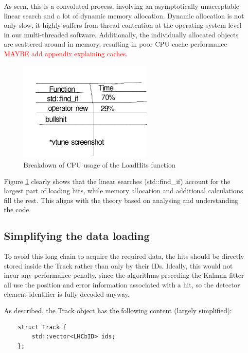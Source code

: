 \documentclass[12pt]{article}
\begin{document}
As seen, this is a convoluted process, involving an asymptotically unacceptable linear search and a lot of dynamic memory allocation. Dynamic allocation is not only slow, it highly suffers from thread contention at the operating system level in our multi-threaded software. Additionally, the individually allocated objects are scattered around in memory, resulting in poor CPU cache performance \textcolor{red}{MAYBE add appendix explaining caches}.

\begin{figure}[H]
	\begin{center}
		\includegraphics[width=0.6\textwidth]{kalmanfit_loadhits_breakdown}
	\end{center}
	\caption{Breakdown of CPU usage of the LoadHits function}
	\label{fig_kalmanfit_loadhits_breakdown}
\end{figure}

Figure \ref{fig_kalmanfit_loadhits_breakdown} clearly shows that the linear searches (std::find\_if) account for the largest part of loading hits, while memory allocation and additional calculations fill the rest. This aligns with the theory based on analysing and understanding the code.


\subsection{Simplifying the data loading}

To avoid this long chain to acquire the required data, the hits should be directly stored inside the Track rather than only by their IDs. Ideally, this would not incur any performance penalty, since the algorithms preceding the Kalman fitter all use the position and error information associated with a hit, so the detector element identifier is fully decoded anyway.

As described, the Track object has the following content (largely simplified):
\begin{lstlisting}
	struct Track {
		std::vector<LHCbID> ids;
	};
\end{lstlisting}
\end{document}
